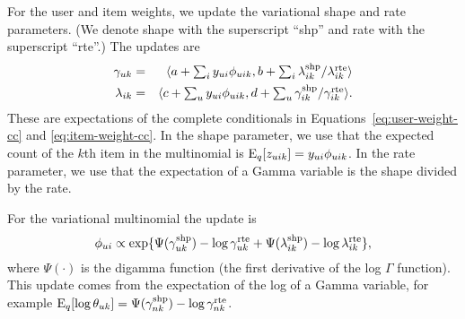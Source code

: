 For the user and item weights, we update the variational shape and
rate parameters.  (We denote shape with the superscript ``shp'' and
rate with the superscript ``rte''.) The updates are
\begin{eqnarray}
  \gamma_{uk} &=& \langle a + \textstyle \sum_{i} y_{ui} \phi_{uik},
  b + \textstyle \sum_i \lambda_{ik}^{\textrm{shp}} / \lambda_{ik}^{\textrm{rte}} \rangle \\
  \lambda_{ik} &=& \langle c + \textstyle \sum_{u} y_{ui} \phi_{uik},
  d + \textstyle \sum_u \gamma_{ik}^{\textrm{shp}} / \gamma_{ik}^{\textrm{rte}} \rangle.
\end{eqnarray}
These are expectations of the complete conditionals in
Equations~\ref{eq:user-weight-cc} and \ref{eq:item-weight-cc}.  In the
shape parameter, we use that the expected count of the $k$th item in
the multinomial is $\textrm{E}_q[z_{uik}] = y_{ui} \phi_{uik}$. In the rate
parameter, we use that the expectation of a Gamma variable is the
shape divided by the rate.

For the variational multinomial the update is
\begin{equation}
  \phi_{ui} \propto \exp\{\Psi(\gamma_{uk}^{\textrm{shp}}) - \log
  \gamma_{uk}^{\textrm{rte}} + \Psi(\lambda_{ik}^{\textrm{shp}}) - \log
  \lambda_{ik}^{\textrm{rte}}\},
\end{equation}
where $\Psi(\cdot)$ is the digamma function (the first derivative of
the log $\Gamma$ function).  This update comes from the expectation of
the log of a Gamma variable, for example $\textrm{E}_q[\log \theta_{uk}] =
\Psi(\gamma_{nk}^{\textrm{shp}}) - \log \gamma_{nk}^{\textrm{rte}}$.

